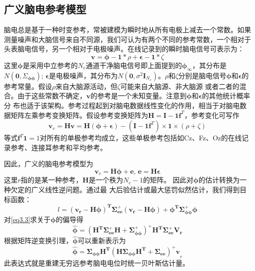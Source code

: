 \subsection{广义脑电参考模型}
脑电总是基于一种时变参考，常被建模为瞬时地从所有电极上减去一个常数。如果测量噪声和大脑信号来自不同源，我们可认为有两个不同的参考常数，一个相对于头表脑电信号，另一个相对于电极噪声。在线记录到的瞬时脑电信号可表示为：
\begin{equation}\label{eq3.1}
\mathbf{v}=\mathbf{\phi}-\mathbf{1}*\rho+\mathbf{\epsilon}-\mathbf{1}*\zeta
\end{equation}
这里$\mathbf{\phi}$是采用中立参考的$N_e$通道干净脑电信号即上面提到的$\mathbf{\phi}_{\infty}$，其分布是$N(\mathbf{0},\Sigma_{\mathbf{\phi}\mathbf{\phi}})$; $\mathbf{\epsilon}$是电极噪声，其分布为$N(\mathbf{0},\sigma^{2}\mathbf{I}_{N_{e}})$。$\rho$和$\zeta$分别是脑电信号$\mathbf{\phi}$和$\mathbf{\epsilon}$的参考常量。假设$\rho$来自大脑源活动，但$\zeta$可能来自大脑源、非大脑源
或者二者的混合。由于这些常数不确定，$\mathbf{v}$的参考是一个未知变量。注意到$\mathbf{\phi}$和$\mathbf{\epsilon}$的其他统计概率分
布也适于该架构。参考过程起到对脑电数据线性变化的作用，相当于对脑电数据矩阵左乘参考变换矩阵。假设参考变换矩阵为$\mathbf{H=I-1f}^T$，参考变化可写作
\begin{equation*}
\mathbf{v}_{r}=\mathbf{Hv}=\mathbf{H(\phi+\epsilon)}-(\mathbf{I-1f}^T)\times\mathbf{1}\times(\rho+\zeta)
\end{equation*}
等式$\mathbf{f}^T\mathbf{1}=1$对所有的单极参考均成立，这些单极参考包括如Cz、Fz、Oz的在线记录参考、连接耳参考和平均参考。

因此，广义的脑电参考模型为
\begin{equation}\label{eq3.2}
\mathbf{v}_{r}=\mathbf{H\phi+e},\,\mathbf{e=H\epsilon}
\end{equation}
这里$r$指的是某一种参考，$\mathbf{H}$是一个秩为$N_{e}-1$的矩阵。 因此对$\mathbf{\phi}$的估计转换为一种欠定的广义线性逆问题。通过最
大后验估计或最大惩罚似然估计，我们得到目标函数：
\begin{equation}\label{eq3.3}
l=\mathbf{(v_{r}-H\phi)^{T}\Sigma_{ee}^{+}(v_{r}-H\phi)+\phi^{T}\Sigma_{\phi\phi}^{+}\phi}
\end{equation}
对\eqref{eq3.3}求关于$\mathbf{\phi}$的偏导得
\begin{equation}
\hat{\mathbf{\phi}}=\mathbf{(H^T\Sigma_{ee}^{+}H+\Sigma_{\phi\phi}^{+})^{+}H^{T}\Sigma_{ee}^{+}V_{r}}
\end{equation}
根据矩阵逆变换引理，$\hat{\mathbf{\phi}}$可以重新表示为
\begin{equation}\label{eq3.4}
\hat{\mathbf{\phi}}=\mathbf{\Sigma_{\phi\phi}H^{T}(H\Sigma_{\phi\phi}H^{T}+\Sigma_{ee})^{+}v}_{r}
\end{equation}
此表达式就是重建无穷远参考脑电电位时统一贝叶斯估计量。

